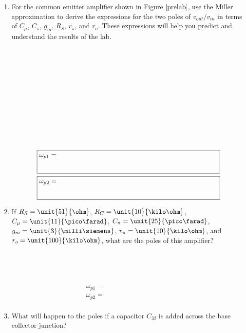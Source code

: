 \documentclass{article}
\begin{document}
\begin{enumerate}
\item	
	For the common emitter amplifier shown in Figure \ref{prelab}, use the Miller approximation to derive the expressions for the two poles of $v_{out}/v_{in}$ in terms of $C_{\mu}$, $C_{\pi}$, $g_m$, $R_S$, $r_{\pi}$, and $r_o$. These expressions will help you predict and understand the results of the lab. \\~\\~\\~\\~\\~\\~\\~\\~\\~\\~\\~\\

  \begin{align*}
    \boxed{\omega_{p1} = \bfrac{}{\bfrac{}{\bfrac{}{\bfrac{}{\bfrac{}{\bfrac{}{}}}}}}~~~~~~~~~~~~~~~~~~~~~~~~~~~~~~~~~~~~~~~~~~~~~~~~~~~~~~~~~~~~~~~~~~} \\
    \boxed{\omega_{p2} = \bfrac{}{\bfrac{}{\bfrac{}{\bfrac{}{\bfrac{}{\bfrac{}{}}}}}}~~~~~~~~~~~~~~~~~~~~~~~~~~~~~~~~~~~~~~~~~~~~~~~~~~~~~~~~~~~~~~~~~~} \\
  \end{align*}

\item
	If $R_S=\unit{51}{\ohm}$, $R_C=\unit{10}{\kilo\ohm}$, $C_{\mu}=\unit{11}{\pico\farad}$, $C_{\pi}=\unit{25}{\pico\farad}$, $g_m=\unit{3}{\milli\siemens}$, $r_{\pi}=\unit{10}{\kilo\ohm}$, and $r_o=\unit{100}{\kilo\ohm}$, what are the poles of this amplifier? \\~\\~\\~\\~\\

  \begin{align*}
    \boxed{\omega_{p1} = ~~~~~~~~~~~~~~~~~~~~~~~~~~~~~~~~~~~~~~~~~~~~} \\
    \boxed{\omega_{p2} = ~~~~~~~~~~~~~~~~~~~~~~~~~~~~~~~~~~~~~~~~~~~~} \\
  \end{align*}

\item 
	What will happen to the poles if a capacitor $C_M$ is added across the base collector junction? \\~\\~\\~\\~\\


\end{enumerate}
\end{document}
